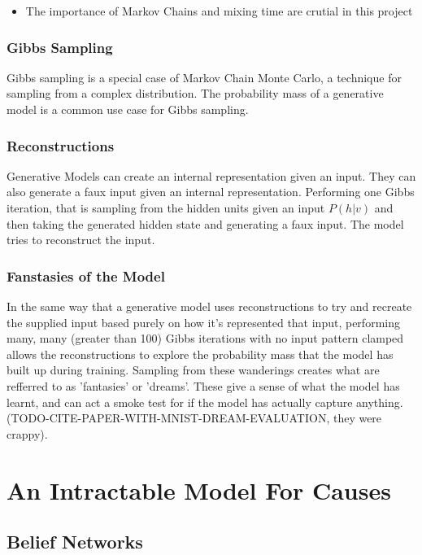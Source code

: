   \begin{itemize}
    \item The importance of Markov Chains and mixing time are crutial in this project
  \end{itemize}


  \subsubsection{Gibbs Sampling}

  Gibbs sampling is a special case of Markov Chain Monte Carlo, a technique for sampling from a complex distribution. The probability mass of a generative model is a common use case for Gibbs sampling.

  \subsubsection{Reconstructions}

  Generative Models can create an internal representation given an input. They can also generate a faux input given an internal representation. Performing one Gibbs iteration, that is sampling from the hidden units given an input $ P(h|v) $ and then taking the generated hidden state and generating a faux input. The model tries to reconstruct the input.

  \subsubsection{Fanstasies of the Model}

  In the same way that a generative model uses reconstructions to try and recreate the      supplied input based purely on how it's represented that input, performing many, many (greater than 100) Gibbs iterations with no input pattern clamped allows the reconstructions to explore the probability mass that the model has built up during training. Sampling from these wanderings creates what are refferred to as 'fantasies' or 'dreams'. These give a sense of what the model has learnt, and can act a smoke test for if the model has actually capture anything.
  (TODO-CITE-PAPER-WITH-MNIST-DREAM-EVALUATION, they were crappy).

\section{An Intractable Model For Causes}
  \subsection{Belief Networks}

